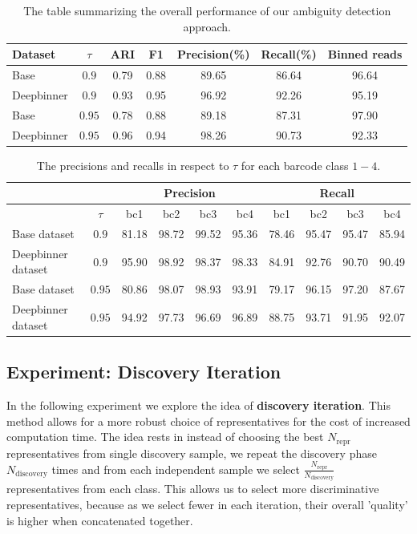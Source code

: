 \begin{table}[!ht]
\centering
\begin{tabular}{|l|c|ccccc|}
\hline
Dataset & $\tau$ & ARI &  F1 & Precision(\%) & Recall(\%) & Binned reads\\
\hline
Base & $0.9$ & 0.79 & 0.88 & 89.65 & 86.64 & 96.64\\
Deepbinner & $0.9$ & 0.93 & 0.95 & 96.92 & 92.26 & 95.19\\
\hline
Base & $0.95$ & 0.78 & 0.88 & 89.18 & 87.31 & 97.90\\
Deepbinner & $0.95$ & 0.96 & 0.94 & 98.26 & 90.73 & 92.33\\
\hline
\end{tabular}
\caption{The table summarizing the overall performance of our ambiguity detection approach.}
\label{tab:ambiguity}
\end{table}

\begin{table}[!htbp]
\centering
\begin{tabular}{lccccc|cccc}
\toprule
 & &  \multicolumn{4}{c}{Precision} & \multicolumn{4}{c}{Recall}\\
\midrule
 & $\tau$ & bc1 & bc2 & bc3  & bc4 & bc1 & bc2 & bc3 & bc4 \\
\hline
Base dataset & $0.9$ & 81.18 & 98.72 & 99.52 & 95.36 & 78.46 & 95.47 & 95.47 & 85.94\\
Deepbinner dataset & $0.9$ & 95.90 & 98.92 & 98.37 & 98.33 & 84.91 & 92.76 & 90.70 & 90.49\\
\hline
Base dataset & $0.95$ & 80.86 & 98.07 & 98.93 & 93.91 & 79.17 & 96.15 & 97.20 & 87.67\\
Deepbinner dataset & $0.95$ & 94.92 & 97.73 & 96.69 &  96.89 & 88.75 & 93.71 & 91.95 & 92.07\\
\bottomrule
\end{tabular}
\caption{The precisions and recalls in respect to $\tau$ for each barcode class $1-4$.}
\label{tab:ambiguity_classes}
\end{table}

\subsection{Experiment: Discovery Iteration}
In the following experiment we explore the idea of \textbf{discovery iteration}. This method allows for a more robust choice of representatives for the cost of increased computation time. The idea rests in instead of choosing the best $N_{\text{repr}}$ representatives from single discovery sample, we repeat the discovery phase $N_{\text{discovery}}$ times and from each independent sample we select $\frac{ N_{\text{repr}} }{ N_{\text{discovery}} }$ representatives from each class. This allows us to select more discriminative representatives, because as we select fewer in each iteration, their overall 'quality' is higher when concatenated together.

